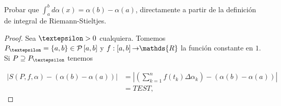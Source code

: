 \setcounter{section}{7}

\begin{exercise}
  Probar que $\int_{a}^{b}d\alpha\left(x\right)=\alpha\left(b\right)-\alpha\left(a\right)$, directamente a partir de la definición de integral de Riemann-Stieltjes.
\end{exercise}

\begin{proof}

  Sea $\text{\textepsilon}>0$ cualquiera. Tomemos $P_{\text{\textepsilon}}=\left\lbrace a,b\right\rbrace\in\mathcal{P}\left[a,b\right]$ y $f:\left[a,b\right]\text{\textrightarrow}\mathds{R}$ la función constante en $1$. Si $P\supseteq P_{\text{\textepsilon}}$ tenemos

  \begin{align*}
  \left| S\left(P,f,\alpha\right)-\left(\alpha\left(b\right)-\alpha\left(a\right)\right)\right|&=\left|\left(\sum_{k=1}^{n}f\left(t_k\right)\Delta\alpha_k\right)-\left(\alpha\left(b\right)-\alpha\left(a\right)\right) \right|\\
  &=TEST,
  \end{align*}

\end{proof}

